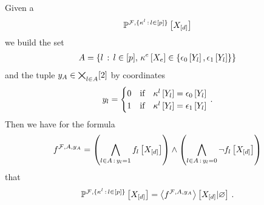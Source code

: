 \begin{theorem}
    Given a \HardLogicNetwork{}
    \begin{align*}
        \mathbb{P}^{\mathcal{F},\{\kappa^{l}\,:\,l\in[p]\}}\left[X_{[d]}\right]
    \end{align*}
    we build the set
    \begin{align*}
        A = \{l\,:\,l\in[p],\,\kappa^{e}\left[X_{e}\right]\in\{\epsilon_0\left[Y_{l}\right],\epsilon_1\left[Y_{l}\right]\}\}
    \end{align*}
    and the tuple $y_{A}\in\bigtimes_{l\in A}[2]$ by coordinates
    \begin{align*}
        y_{l}
        = \begin{cases}
              0 & \text{if} \quad \kappa^{l}\left[Y_{l}\right] = \epsilon_0\left[Y_{l}\right] \\
              1 & \text{if} \quad \kappa^{l}\left[Y_{l}\right] = \epsilon_1\left[Y_{l}\right] \\
        \end{cases} \, .
    \end{align*}
    Then we have for the formula
    \begin{align*}
        f^{\mathcal{F},A,y_{A}} =
        \left(\bigwedge_{l\in A\,:\,y_{l}=1} f_{l}\left[X_{[d]}\right]\right)
        \land
        \left(\bigwedge_{l\in A\,:\,y_{l}=0} \lnot f_{l}\left[X_{[d]}\right]\right)
    \end{align*}
    that
    \begin{align*}
        \mathbb{P}^{\mathcal{F},\{\kappa^{l}\,:\,l\in[p]\}}\left[X_{[d]}\right]
        = \left\langle f^{\mathcal{F},A,y_{A}}\right\rangle \left[ X_{[d]} | \varnothing \right] \, .
    \end{align*}
%
%
\end{theorem}
